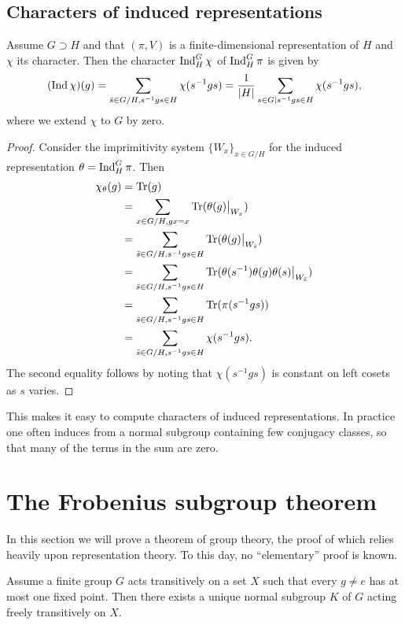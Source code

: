 \documentclass[11pt, english]{article}
\begin{document}
\subsection{Characters of induced representations}

\begin{prop}
\label{inducedcharacter}
 Assume $G \supset H$ and that $(\pi,V)$ is a finite-dimensional representation of $H$ and $\chi$ its character. Then the character $\operatorname{Ind}_H^G \chi$ of $\operatorname{Ind}_H^G \pi$ is given by
$$
(\operatorname{Ind} \chi)(g) = \sum_{\bar s \in G/H, s^{-1}gs \in H} \chi(s^{-1}gs) =\frac{1}{\lvert H \rvert} \sum_{s \in G \mid s^{-1}gs \in H} \chi(s^{-1}gs),
$$
where we extend $\chi$ to $G$ by zero.
\end{prop}
\begin{proof}
Consider the imprimitivity system $\{W_x\}_{x \in G/H}$ for the induced representation $\theta = \operatorname{Ind}_H^G \pi$. Then
\begin{align*}
  \chi_\theta(g) &= \tr(g) \\
 &=\sum_{x \in G/H, gx=x} \tr(\restr{\theta(g)}{W_x}) \\
&= \sum_{\bar s \in G/H, s^{-1}gs \in H} \tr( \restr{\theta(g)}{W_{\bar s}})  \\
&= \sum_{\bar s \in G/H, s^{-1}gs \in H} \tr( \restr{\theta(s^{-1})\theta(g)\theta(s)}{W_{\bar e}})   \\
&= \sum_{\bar s \in G/H, s^{-1}gs \in H} \tr( \pi(s^{-1}gs)) \\
&= \sum_{\bar s \in G/H, s^{-1}gs \in H} \chi(s^{-1}gs).
\end{align*}
The second equality follows by noting that $\chi(s^{-1}gs)$ is constant on left cosets as $s$ varies.
\end{proof}

This makes it easy to compute characters of induced representations. In practice one often induces from a normal subgroup containing few conjugacy classes, so that many of the terms in the sum are zero.


\newpage
\section{The Frobenius subgroup theorem}

In this section we will prove a theorem of group theory, the proof of which relies heavily upon representation theory. To this day, no ``elementary'' proof is known.

\begin{thm}
  Assume a finite group $G$ acts transitively on a set $X$ such that every $g \neq e$ has at most one fixed point. Then there exists a unique normal subgroup $K$ of $G$ acting freely transitively on $X$.
\end{thm}
\end{document}
